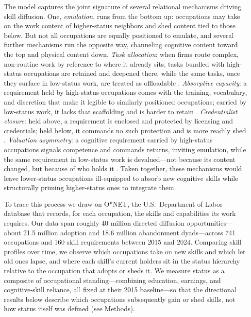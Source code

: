 \documentclass[11pt, letterpaper]{article} %
\newcommand{\parencite}[1]{\cite{#1}}
\begin{document}
The model captures the joint signature of several relational mechanisms driving skill diffusion. One, \emph{emulation}, runs from the bottom up: occupations may take on the work content of higher-status neighbors and shed content tied to those below. But not all occupations are equally positioned to emulate, and several further mechanisms run the opposite way, channeling cognitive content toward the top and physical content down. \emph{Task allocation}: when firms route complex, non-routine work by reference to where it already sits, tasks bundled with high-status occupations are retained and deepened there, while the same tasks, once they surface in low-status work, are treated as offloadable \parencite{autor_skill_2003}. \emph{Absorptive capacity}: a requirement held by high-status occupations comes with the training, vocabulary, and discretion that make it legible to similarly positioned occupations; carried by low-status work, it lacks that scaffolding and is harder to retain \parencite{cohen_absorptive_1990}. \emph{Credentialist closure}: held above, a requirement is enclosed and protected by licensing and credentials; held below, it commands no such protection and is more readily shed \parencite{abbott_system_1988, weeden_why_2002, kleiner_licensing_2013}. \emph{Valuation asymmetry}: a cognitive requirement carried by high-status occupations signals competence and commands returns, inviting emulation, while the same requirement in low-status work is devalued---not because its content changed, but because of who holds it \parencite{deming_growing_2017}. Taken together, these mechanisms would leave lower-status occupations ill-equipped to absorb new cognitive skills while structurally priming higher-status ones to integrate them.

To trace this process we draw on O*NET, the U.S.\ Department of Labor database that records, for each occupation, the skills and capabilities its work requires. Our data span roughly 40 million directed diffusion opportunities---about 21.5 million adoption and 18.6 million abandonment dyads---across 741 occupations and 160 skill requirements between 2015 and 2024. Comparing skill profiles over time, we observe which occupations take on new skills and which let old ones lapse, and where each skill's current holders sit in the status hierarchy relative to the occupation that adopts or sheds it. We measure status as a composite of occupational standing---combining education, earnings, and cognitive-skill reliance, all fixed at their 2015 baseline---so that the directional results below describe which occupations subsequently gain or shed skills, not how status itself was defined (see Methods).
\end{document}
